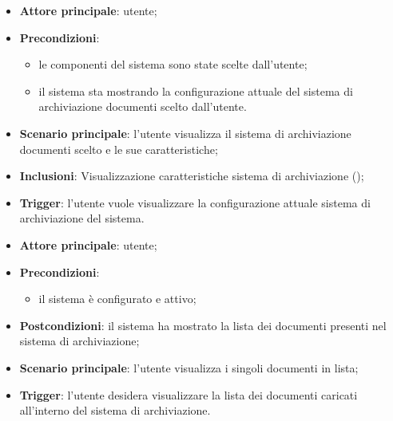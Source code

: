 \documentclass[10pt, a4paper]{article}
\begin{document}
    \begin{itemize}
        \item \textbf{Attore principale}: utente;
        \item \textbf{Precondizioni}: 
        \begin{itemize}
            \item le componenti del sistema sono state scelte dall'utente;
            \item il sistema sta mostrando la configurazione attuale del sistema di archiviazione documenti scelto dall'utente.
        \end{itemize}
        \item \textbf{Scenario principale}: l’utente visualizza il sistema di archiviazione documenti scelto e le sue caratteristiche;
        \item \textbf{Inclusioni}: Visualizzazione caratteristiche sistema di archiviazione ();
        \item \textbf{Trigger}: l’utente vuole visualizzare la configurazione attuale sistema di archiviazione del sistema.
    \end{itemize}

    \begin{itemize}
        \item \textbf{Attore principale}: utente;
        \item \textbf{Precondizioni}:
            \begin{itemize}
                \item il sistema è configurato e attivo;
            \end{itemize}
        \item \textbf{Postcondizioni}: il sistema ha mostrato la lista dei documenti presenti nel sistema di archiviazione;
        \item \textbf{Scenario principale}: l'utente visualizza i singoli documenti in lista;
        \item \textbf{Trigger}: l’utente desidera visualizzare la lista dei documenti caricati all’interno del sistema di archiviazione.
    \end{itemize}
\end{document}
